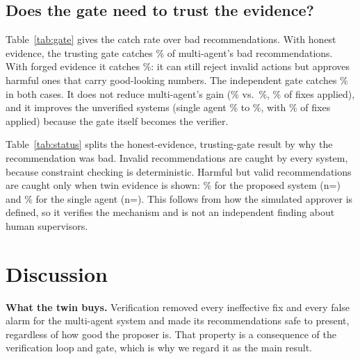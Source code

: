 \documentclass[conference]{IEEEtran}
\begin{document}
\subsection{Does the gate need to trust the evidence?}
Table~\ref{tab:gate} gives the catch rate over bad recommendations. With honest evidence, the trusting gate
catches \CatchHonestTrustMulti\% of multi-agent's bad recommendations. With forged evidence it catches
\CatchForgedTrustMulti\%: it can still reject invalid actions but approves harmful ones that carry good-looking
numbers. The independent gate catches \CatchForgedIndepMulti\% in both cases. It does not reduce
multi-agent's gain (\IndepGainMulti\% vs.\ \GainMulti\%, \IndepAppliedMulti\% of fixes applied), and it improves
the unverified systems (single agent \GainSingle\% to \IndepGainSingle\%, with \IndepAppliedSingle\% of fixes
applied) because the gate itself becomes the verifier.
\begin{table}[t]
\centering\small
\caption{Gate catch rate (\%) over bad recommendations reaching the gate (count in parentheses). ``Forged'': the bad fix carries the good fix's evidence.}
\label{tab:gate}

\end{table}

Table~\ref{tab:status} splits the honest-evidence, trusting-gate result by why the recommendation was bad.
Invalid recommendations are caught by every system, because constraint checking is deterministic. Harmful but
valid recommendations are caught only when twin evidence is shown: \HarmCatchMulti\% for the proposed system
(n=\HarmNMulti) and \HarmCatchSingle\% for the single agent (n=\HarmNSingle). This follows from how the
simulated approver is defined, so it verifies the mechanism and is not an independent finding about human
supervisors.
\begin{table}[t]
\centering\small
\caption{Trusting-gate catch rate (\%) by reason the recommendation was bad, stress experiment (count in parentheses).}
\label{tab:status}

\end{table}

\section{Discussion}
\textbf{What the twin buys.} Verification removed every ineffective fix and every false alarm for the
multi-agent system and made its recommendations safe to present, regardless of how good the proposer is.
That property is a consequence of the verification loop and gate, which is why we regard it as the main result.
\end{document}
